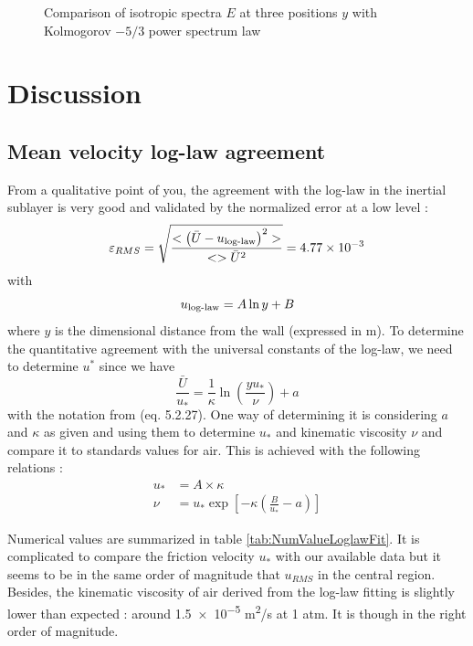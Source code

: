 \documentclass[12pt]{article}
\begin{document}
 
 
\begin{figure}
    \centering
    \resizebox{0.6\linewidth}{!}{}
    \caption{Comparison of isotropic spectra $E$ at three positions $y$ with Kolmogorov $-5/3$ power spectrum law}
    \label{fig:F_comparison}
\end{figure}

\section{Discussion}

\subsection{Mean velocity log-law agreement}

From a qualitative point of you, the agreement with the log-law in the inertial sublayer is very good and validated by the normalized error at a low level :\\

\begin{equation}
    \varepsilon_{RMS} = \sqrt{\frac{<\left( \bar{U} - u_{\textnormal{log-law}} \right)^2>}{<>\bar{U}^2}} = \num{4.77e-3}
\end{equation}
with 
\begin{equation}
    u_{\textnormal{log-law}} = A \ln{y} + B
\end{equation}
where $y$ is the dimensional distance from the wall (expressed in \si{m}). To determine the quantitative agreement with the universal constants of the log-law, we need to determine $u^*$ since we have 
\begin{equation}
    \frac{\bar{U}}{u_*} = \frac{1}{\kappa}\ln(\frac{y u_*}{\nu}) + a
\end{equation}
with the notation from \cite{tennekesFirstCourseTurbulence1972} (eq. 5.2.27). One way of determining it is considering $a$ and $\kappa$ as given and using them to determine $u_*$ and kinematic viscosity $\nu$ and compare it to standards values for air. This is achieved with the following relations :
\begin{align}
    u_* &= A\times \kappa \\
    \nu &= u_* \exp \left[ -\kappa\left( \frac{B}{u_*} -a \right) \right]
\end{align}

Numerical values are summarized in table \ref{tab:NumValueLoglawFit}. It is complicated to compare the friction velocity $u_*$ with our available data but it seems to be in the same order of magnitude that $u_{RMS}$ in the central region. Besides, the kinematic viscosity of air derived from the log-law fitting is slightly lower than expected : around \num{1.5e-5} \si{m^2/s} at 1 \si{atm}. It is though in the right order of magnitude.\\
\end{document}
